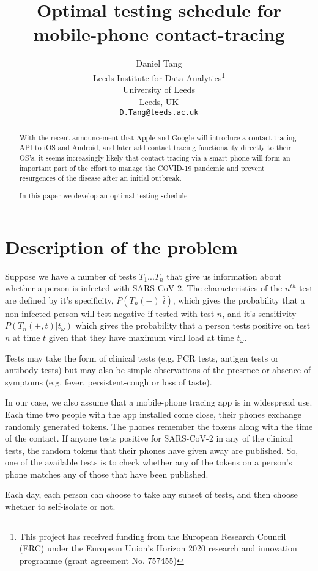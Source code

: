 \documentclass{article}
\title{Optimal testing schedule for mobile-phone contact-tracing}
\author{
  Daniel Tang\\
  Leeds Institute for Data Analytics\thanks{This project has received funding from the European Research Council (ERC) under the European Union’s Horizon 2020 research and innovation programme (grant agreement No. 757455)}\\
  University of Leeds\\
  Leeds, UK\\
  \texttt{D.Tang@leeds.ac.uk} \\
}
\begin{document}
\maketitle

\begin{abstract}
With the recent announcement\cite{applegoogle} that Apple and Google will introduce a contact-tracing API to iOS and Android, and later add contact tracing functionality directly to their OS's, it seems increasingly likely that contact tracing via a smart phone will form an important part of the effort to manage the COVID-19 pandemic and prevent resurgences of the disease after an initial outbreak.

In this paper we develop an optimal testing schedule 
\end{abstract}


\section{Description of the problem}

Suppose we have a number of tests $T_1...T_n$ that give us information about whether a person is infected with SARS-CoV-2. The characteristics of the $n^{th}$ test are defined by it's specificity, $P(T_n(-)|\bar{i})$, which gives the probability that a non-infected person will test negative if tested with test $n$, and it's sensitivity $P(T_n(+,t)|t_\omega)$ which gives the probability that a person tests positive on test $n$ at time $t$ given that they have maximum viral load at time $t_\omega$.

Tests may take the form of clinical tests (e.g. PCR tests, antigen tests or antibody tests) but may also be simple observations of the presence or absence of symptoms (e.g. fever, persistent-cough or loss of taste).

In our case, we also assume that a mobile-phone tracing app is in widespread use. Each time two people with the app installed come close, their phones exchange randomly generated tokens. The phones remember the tokens along with the time of the contact. If anyone tests positive for SARS-CoV-2 in any of the clinical tests, the random tokens that their phones have given away are published. So, one of the available tests is to check whether any of the tokens on a person's phone matches any of those that have been published.

Each day, each person can choose to take any subset of tests, and then choose whether to self-isolate or not.
\end{document}
